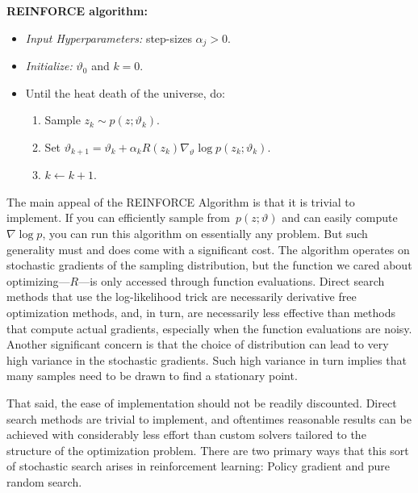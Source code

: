 \documentclass{tufte-book}
\begin{document}
\begin{Algorithm}

\textbf{REINFORCE algorithm:}

\begin{itemize}
\tightlist
\item
  \emph{Input Hyperparameters:} step-sizes \(\alpha_j>0\).
\item
  \emph{Initialize:} \(\vartheta_0\) and \(k = 0\).
\item
  Until the heat death of the universe, do:

  \begin{enumerate}
  \def\labelenumi{\arabic{enumi}.}
  \tightlist
  \item
    Sample \(z_k\sim p(z;\vartheta_k)\).
  \item
    Set
    \(\vartheta_{k+1} = \vartheta_k + \alpha_k R(z_k) \nabla_\vartheta \log p(z_k; \vartheta_k)\).
  \item
    \(k\leftarrow k + 1\).
  \end{enumerate}
\end{itemize}

\end{Algorithm}

The main appeal of the REINFORCE Algorithm is that it is trivial to
implement. If you can efficiently sample from~\(p(z;\vartheta)\) and can
easily compute~\(\nabla \log p\), you can run this algorithm on
essentially any problem. But such generality must and does come with a
significant cost. The algorithm operates on stochastic gradients of the
sampling distribution, but the function we cared about
optimizing---\(R\)---is only accessed through function evaluations.
Direct search methods that use the log-likelihood trick are necessarily
derivative free optimization methods, and, in turn, are necessarily less
effective than methods that compute actual gradients, especially when
the function evaluations are noisy. Another significant concern is that
the choice of distribution can lead to very high variance in the
stochastic gradients. Such high variance in turn implies that many
samples need to be drawn to find a stationary point.

That said, the ease of implementation should not be readily discounted.
Direct search methods are trivial to implement, and oftentimes
reasonable results can be achieved with considerably less effort than
custom solvers tailored to the structure of the optimization problem.
There are two primary ways that this sort of stochastic search arises in
reinforcement learning: Policy gradient and pure random search.
\end{document}
